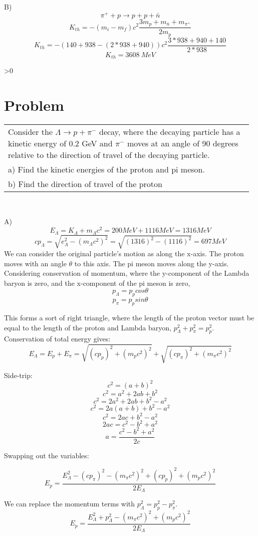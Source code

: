 \documentclass{article}
\newcounter{problemnumber}\setcounter{problemnumber}{1}
\newcommand{\problem}[1][-1]{
    \setcounter{partnumber}{1}
    \ifnum#1>0
        \setcounter{problemnumber}{#1}
    \fi
    \section*{Problem \arabic{problemnumber}}
    \stepcounter{problemnumber}
}
\newcounter{partnumber}\setcounter{partnumber}{1}
\newenvironment{question}{
    \color{gray}\itshape
    \vspace{5pt}
    \begin{tabular}{|p{0.97\linewidth}}
}{
    \end{tabular}\\[5pt]
}
\begin{document}
B) $$ \pi^+  + p \rightarrow p + p + \bar{n} $$
$$ K_{th} = -(m_i - m_f)c^2\frac{3m_p + m_{\bar{n}} + m_{\pi^+}}{2m_p} $$
$$ K_{th} = -(140 + 938 - (2*938 + 940))c^2\frac{3*938 + 940 + 140}{2*938} $$
$$ K_{th} = 3608\ MeV $$

\newpage
\problem
\begin{question}
	Consider the $\Lambda \rightarrow p + \pi^-$ decay, where the decaying particle has a kinetic energy of 0.2 GeV and $\pi^-$ moves at an angle of 90 degrees relative to the direction of travel of the decaying particle.\\
	a) Find the kinetic energies of the proton and pi meson.\\
	b) Find the direction of travel of the proton
\end{question}

A) \\
$$  E_\Lambda = K_\Lambda +m_\Lambda c^2 = 200 MeV + 1116 MeV = 1316 MeV $$
$$ cp_\Lambda = \sqrt{e^2_\Lambda - (m_\Lambda c^2)^2} = \sqrt{(1316)^2 - (1116)^2} = 697 MeV $$
We can consider the original particle's motion as along the x-axis.
The proton moves with an angle $\theta$ to this axis.
The pi meson moves along the y-axis.
Considering conservation of momentum,
where the y-component of the Lambda baryon is zero,
and the x-component of the pi meson is zero,
$$ p_\Lambda = p_p cos\theta $$
$$ p_\pi = p_p sin\theta $$

This forms a sort of right triangle, where the length of the proton vector must be equal to the length of the proton and Lambda baryon, $p_\Lambda^2 + p_\pi^2 =p_p^2$. \\

Conservation of total energy gives:
$$ E_\Lambda = E_p + E_\pi = \sqrt{(cp_p)^2 + (m_pc^2)^2} + \sqrt{(cp_\pi)^2 + (m_\pi c^2)^2} $$

Side-trip:
$$ c^2 = (a + b)^2 $$
$$ c^2 = a^2 + 2ab + b^2 $$
$$ c^2 = 2a^2 + 2ab + b^2 - a^2 $$
$$ c^2 = 2a(a + b) + b^2 - a^2 $$
$$ c^2 = 2ac + b^2 - a^2 $$
$$ 2ac = c^2 - b^2 + a^2 $$
$$ a = \frac{c^2 - b^2 + a^2}{2c} $$

Swapping out the variables:

$$ E_p = 
\frac{E_\Lambda^2 - (cp_\pi)^2 - (m_\pi c^2)^2 
+ (cp_p)^2 + (m_pc^2)^2}{2E_\Lambda} $$

We can replace the momentum terms with $p_\Lambda^2 = p_p^2- p_\pi^2 $. \\
$$ E_p = 
\frac{E_\Lambda^2 + p_\Lambda^2 
- (m_\pi c^2)^2 + (m_pc^2)^2}{2E_\Lambda} $$
\end{document}
